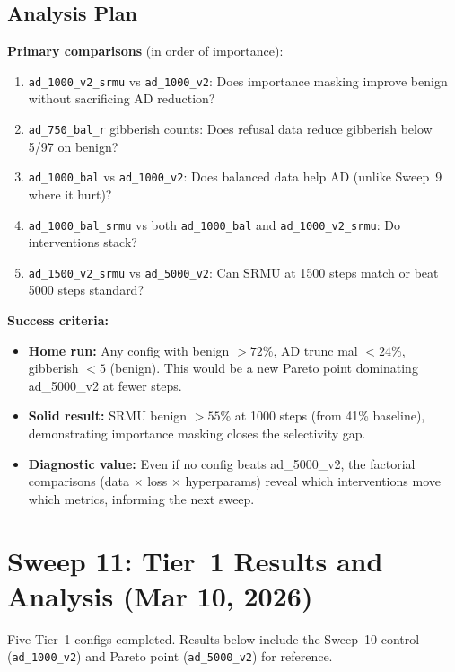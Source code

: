 \documentclass[11pt]{article}
\begin{document}
\subsection{Analysis Plan}

\textbf{Primary comparisons} (in order of importance):
\begin{enumerate}
  \item \texttt{ad\_1000\_v2\_srmu} vs \texttt{ad\_1000\_v2}: Does importance
        masking improve benign without sacrificing AD reduction?
  \item \texttt{ad\_750\_bal\_r} gibberish counts: Does refusal data reduce
        gibberish below 5/97 on benign?
  \item \texttt{ad\_1000\_bal} vs \texttt{ad\_1000\_v2}: Does balanced data
        help AD (unlike Sweep~9 where it hurt)?
  \item \texttt{ad\_1000\_bal\_srmu} vs both \texttt{ad\_1000\_bal} and
        \texttt{ad\_1000\_v2\_srmu}: Do interventions stack?
  \item \texttt{ad\_1500\_v2\_srmu} vs \texttt{ad\_5000\_v2}: Can SRMU at
        1500 steps match or beat 5000 steps standard?
\end{enumerate}

\textbf{Success criteria:}
\begin{itemize}
  \item \textbf{Home run:} Any config with benign $>72\%$, AD trunc mal
        $<24\%$, gibberish $<5$ (benign). This would be a new Pareto point
        dominating ad\_5000\_v2 at fewer steps.
  \item \textbf{Solid result:} SRMU benign $>55\%$ at 1000 steps (from 41\%
        baseline), demonstrating importance masking closes the selectivity gap.
  \item \textbf{Diagnostic value:} Even if no config beats ad\_5000\_v2, the
        factorial comparisons (data $\times$ loss $\times$ hyperparams) reveal
        which interventions move which metrics, informing the next sweep.
\end{itemize}

\section{Sweep 11: Tier~1 Results and Analysis (Mar 10, 2026)}
\label{sec:sweep11-tier1}

Five Tier~1 configs completed.  Results below include the Sweep~10 control
(\texttt{ad\_1000\_v2}) and Pareto point (\texttt{ad\_5000\_v2}) for reference.
\end{document}
